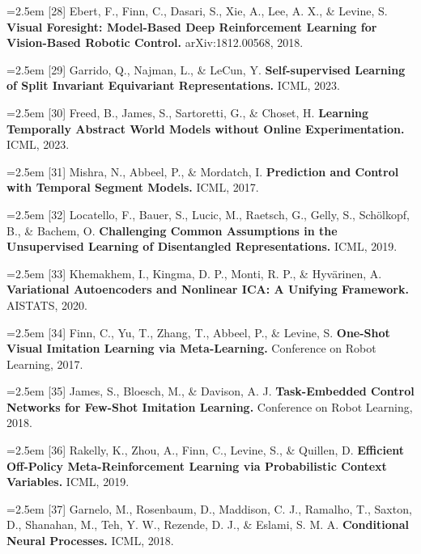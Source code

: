 \documentclass[11pt]{article}
\begin{document}
\noindent\hangindent=2.5em [28] Ebert, F., Finn, C., Dasari, S., Xie, A., Lee, A. X., \& Levine, S. \textbf{Visual Foresight: Model-Based Deep Reinforcement Learning for Vision-Based Robotic Control.} arXiv:1812.00568, 2018.\par

\noindent\hangindent=2.5em [29] Garrido, Q., Najman, L., \& LeCun, Y. \textbf{Self-supervised Learning of Split Invariant Equivariant Representations.} ICML, 2023.\par

\noindent\hangindent=2.5em [30] Freed, B., James, S., Sartoretti, G., \& Choset, H. \textbf{Learning Temporally Abstract World Models without Online Experimentation.} ICML, 2023.\par

\noindent\hangindent=2.5em [31] Mishra, N., Abbeel, P., \& Mordatch, I. \textbf{Prediction and Control with Temporal Segment Models.} ICML, 2017.\par

\noindent\hangindent=2.5em [32] Locatello, F., Bauer, S., Lucic, M., Raetsch, G., Gelly, S., Sch\"olkopf, B., \& Bachem, O. \textbf{Challenging Common Assumptions in the Unsupervised Learning of Disentangled Representations.} ICML, 2019.\par

\noindent\hangindent=2.5em [33] Khemakhem, I., Kingma, D. P., Monti, R. P., \& Hyv\"arinen, A. \textbf{Variational Autoencoders and Nonlinear ICA: A Unifying Framework.} AISTATS, 2020.\par

\noindent\hangindent=2.5em [34] Finn, C., Yu, T., Zhang, T., Abbeel, P., \& Levine, S. \textbf{One-Shot Visual Imitation Learning via Meta-Learning.} Conference on Robot Learning, 2017.\par

\noindent\hangindent=2.5em [35] James, S., Bloesch, M., \& Davison, A. J. \textbf{Task-Embedded Control Networks for Few-Shot Imitation Learning.} Conference on Robot Learning, 2018.\par

\noindent\hangindent=2.5em [36] Rakelly, K., Zhou, A., Finn, C., Levine, S., \& Quillen, D. \textbf{Efficient Off-Policy Meta-Reinforcement Learning via Probabilistic Context Variables.} ICML, 2019.\par

\noindent\hangindent=2.5em [37] Garnelo, M., Rosenbaum, D., Maddison, C. J., Ramalho, T., Saxton, D., Shanahan, M., Teh, Y. W., Rezende, D. J., \& Eslami, S. M. A. \textbf{Conditional Neural Processes.} ICML, 2018.\par
\end{document}

